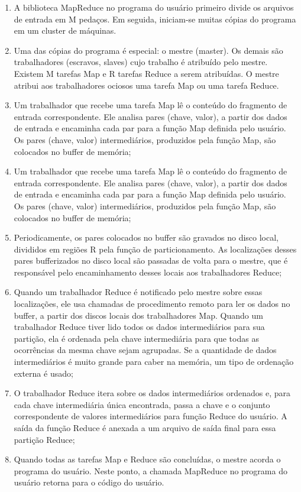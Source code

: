 \begin{enumerate}
\item A biblioteca MapReduce no programa do usuário primeiro divide os arquivos de entrada em M pedaços. Em seguida, iniciam-se muitas cópias do programa em um cluster de máquinas.

\item Uma das cópias do programa é especial: o mestre (master). Os demais são trabalhadores (escravos, slaves) cujo trabalho é atribuído pelo mestre. Existem M tarefas Map e R tarefas Reduce a serem atribuídas. O mestre atribui aos trabalhadores ociosos uma tarefa Map ou uma tarefa Reduce.

\item Um trabalhador que recebe uma tarefa Map lê o conteúdo do fragmento de entrada correspondente. Ele analisa pares (chave, valor), a partir dos dados de entrada e encaminha cada par para a função Map definida pelo usuário. Os pares (chave, valor) intermediários, produzidos pela função Map, são colocados no buffer de memória; 

\item Um trabalhador que recebe uma tarefa Map lê o conteúdo do fragmento de entrada correspondente. Ele analisa pares (chave, valor), a partir dos dados de entrada e encaminha cada par para a função Map definida pelo usuário. Os pares (chave, valor) intermediários, produzidos pela função Map, são colocados no buffer de memória; 

\item Periodicamente, os pares colocados no buffer são gravados no disco local, divididos em regiões R pela função de particionamento. As localizações desses pares bufferizados no disco local são passadas de volta para o mestre, que é responsável pelo encaminhamento desses locais aos trabalhadores Reduce; 

\item Quando um trabalhador Reduce é notificado pelo mestre sobre essas localizações, ele usa chamadas de procedimento remoto para ler os dados no buffer, a partir dos discos locais dos trabalhadores Map. Quando um trabalhador Reduce tiver lido todos os dados intermediários para sua partição, ela é ordenada pela chave intermediária para que todas as ocorrências da mesma chave sejam agrupadas. Se a quantidade de dados intermediários é muito grande para caber na memória, um tipo de ordenação externa é usado; 

\item O trabalhador Reduce itera sobre os dados intermediários ordenados e, para cada chave intermediária única encontrada, passa a chave e o conjunto correspondente de valores intermediários para função Reduce do usuário. A saída da função Reduce é anexada a um arquivo de saída final para essa partição Reduce; 

\item Quando todas as tarefas Map e Reduce são concluídas, o mestre acorda o programa do usuário. Neste ponto, a chamada MapReduce no programa do usuário retorna para o código do usuário.
			 		
\end{enumerate}



